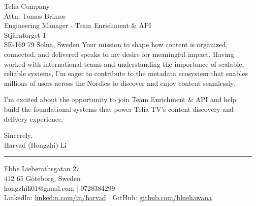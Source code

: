 \documentclass[a4paper,10pt]{article}
\begin{document}
\begin{letter}{\color{darkblue}
Telia Company\\
Attn: Tomas Brimor\\
Engineering Manager - Team Enrichment \& API\\
Stjärntorget 1\\
SE-169 79 Solna, Sweden}
Your mission to shape how content is organized, connected, and delivered speaks to my desire for meaningful impact. Having worked with international teams and understanding the importance of scalable, reliable systems, I'm eager to contribute to the metadata ecosystem that enables millions of users across the Nordics to discover and enjoy content seamlessly.

I'm excited about the opportunity to join Team Enrichment \& API and help build the foundational systems that power Telia TV's content discovery and delivery experience.

\vspace{10pt}

\closing{
Sincerely,\\
\vspace{15pt}
Harvad (Hongzhi) Li
}

\vspace{20pt}

{\color{darkblue}\rule{\linewidth}{0.6pt}}
\vspace{4pt}

{\color{darkblue}
Ebbe Lieberathsgatan 27\\
412 65 Göteborg, Sweden\\
hongzhili01@gmail.com | 0728384299\\
LinkedIn: \href{https://www.linkedin.com/in/harvad/}{linkedin.com/in/harvad} | GitHub: \href{https://github.com/bluehawana}{github.com/bluehawana}
}

\end{letter}
\end{document}
